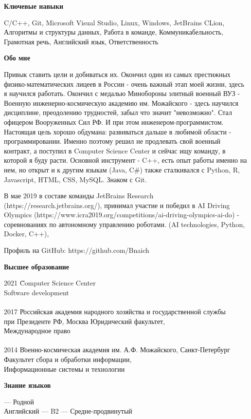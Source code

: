 \documentclass[9pt,fleqn,a4paper]{article}
\begin{document}
	\begin{center}
		{\large\bf Ключевые навыки}
	\end{center}	
	
	\noindent C/C++, Git, Microsoft Visual Studio, Linux, Windows, JetBrains CLion, Алгоритмы и структуры данных,  
        Работа в команде, Коммуникабельность, Грамотная речь, Английский язык, Ответственность \\

	\begin{center}
		{\large\bf Обо мне}
	\end{center}	

Привык ставить цели и добиваться их. Окончил один из самых престижных физико-математических лицеев в России - очень важный этап моей жизни, здесь я научился работать. Окончил с медалью Минобороны элитный военный ВУЗ - Военную инженерно-космическую академию им. Можайского - здесь научился дисциплине, преодолению трудностей, забыл что значит "невозможно". Стал офицером Вооруженных Сил РФ. И при этом инженером-программистом. Настоящая цель хорошо обдумана: развиваться дальше в любимой области - программировании. Именно поэтому решил не продлевать свой военный контракт, а поступил в Computer Science Center и сейчас ищу команду, в которой я буду расти. Основной инструмент - C++, есть опыт работы именно на нем, но открыт и к другим языкам (Java, C\#) также сталкивался с Python, R, Javascript, HTML, CSS, MySQL. Знаком с Git.

В мае 2019 в составе команды JetBrains Research (https://research.jetbrains.org/), принимал участие и победил в AI Driving Olympics (https://www.icra2019.org/competitions/ai-driving-olympics-ai-do) - соревнованиях по автономному управлению роботами.
(AI technologies, Python, Docker, C++),

Профиль на GitHub: https://github.com/Bnaich

	\begin{center}
		{\large\bf Высшее образование}
	\end{center}

\begin{tabbing}
2021
	\hspace{5cm} \= \= Computer Science Center \\
	 \> Software development \\
\\
2017
	\hspace{5cm} \= \= Российская академия народного хозяйства и государственной службы\\ \> при Президенте РФ, Москва
Юридический факультет, \\ \> Международное право \\
\\
2014
	\hspace{5cm} \= \= Военно-космическая академия им. А.Ф. Можайского, Санкт-Петербург \\
\> Факультет сбора и обработки информации, \\ \> Информационные системы и технологии
 \\
\end{tabbing}

	\begin{center}
		{\large\bf Знание языков}
	\end{center}	
	
	 — Родной \\
	Английский — B2 — Средне-продвинутый \\
	
	
\end{document}
